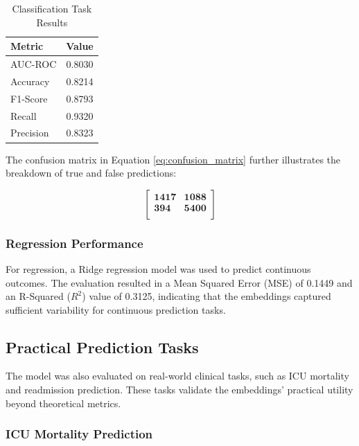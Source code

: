 \documentclass[twocolumn]{article}
\begin{document}
    \begin{table}[h]
        \centering
        \begin{tabular}{|l|c|}
            \hline
            \textbf{Metric} & \textbf{Value} \\
            \hline
            AUC-ROC         & 0.8030         \\
            Accuracy        & 0.8214         \\
            F1-Score        & 0.8793         \\
            Recall          & 0.9320         \\
            Precision       & 0.8323         \\
            \hline
        \end{tabular}
        \caption{Classification Task Results}
        \label{tab:classification_results}
    \end{table}

    The confusion matrix in Equation \ref{eq:confusion_matrix} further
    illustrates the breakdown of true and false predictions:

    \[
        \begin{bmatrix}
            \textbf{1417} & \textbf{1088} \\
            \textbf{394}  & \textbf{5400} \\
        \end{bmatrix}
        \label{eq:confusion_matrix}
    \]

    \subsubsection{Regression Performance}

    For regression, a Ridge regression model was used to predict continuous outcomes.
    The evaluation resulted in a Mean Squared Error (MSE) of 0.1449 and an R-Squared
    ($R^{2}$) value of 0.3125, indicating that the embeddings captured sufficient
    variability for continuous prediction tasks.

    \subsection{Practical Prediction Tasks}

    The model was also evaluated on real-world clinical tasks, such as ICU mortality
    and readmission prediction. These tasks validate the embeddings' practical utility
    beyond theoretical metrics.
    \subsubsection{ICU Mortality Prediction}
\end{document}
